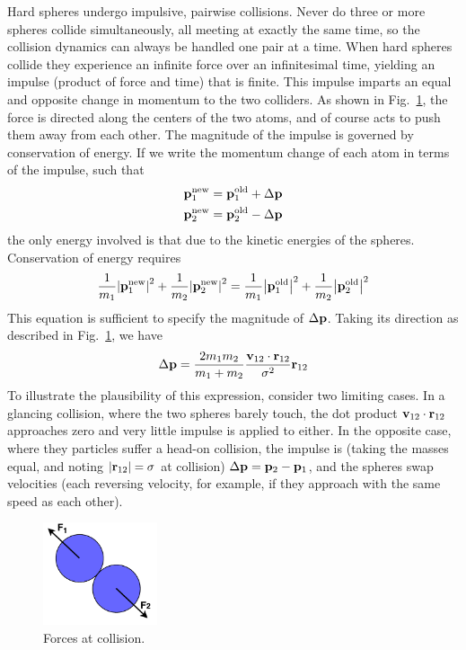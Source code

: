 \documentclass[9pt,bestpractices]{molsim}
\begin{document}
Hard spheres undergo impulsive, pairwise collisions. Never do three or
more spheres collide simultaneously, all meeting at exactly the same
time, so the collision dynamics can always be handled one pair at a
time. When hard spheres collide they experience an infinite force over
an infinitesimal time, yielding an impulse (product of force and time)
that is finite. This impulse imparts an equal and opposite change in
momentum to the two colliders. As shown in Fig.~\ref{fig:force}, the force is
directed along the centers of the two atoms, and of course acts to push
them away from each other. The magnitude of the impulse is governed by
conservation of energy. If we write the momentum change of each atom in
terms of the impulse, such that
\begin{align*}
  &{\bf{p}}_1^{\rm new} = {\bf{p}}_1^{\rm old} + \Delta {\bf{p}}\\
  &{\bf{p}}_2^{\rm new} = {\bf{p}}_2^{\rm old} - \Delta {\bf{p}}
\end{align*}
the only energy involved is that due to the kinetic energies of the
spheres. Conservation of energy requires
\[\frac{1}{{{m_1}}}{\left| {{\bf{p}}_1^{\rm new}} \right|^2} + \frac{1}{{{m_2}}}{\left| {{\bf{p}}_2^{\rm new}} \right|^2} = \frac{1}{{{m_1}}}{\left| {{\bf{p}}_1^{\rm old}} \right|^2} + \frac{1}{{{m_2}}}{\left| {{\bf{p}}_2^{\rm old}} \right|^2}\]
This equation is sufficient to specify the magnitude of $\Delta {\bf{p}}$. Taking its
direction as described in Fig.~\ref{fig:force}, we have
\[\Delta {\bf{p}} = \frac{{2{m_1}{m_2}}}{{{m_1} + {m_2}}}\frac{{{{\bf{v}}_{12}} \cdot {{\bf{r}}_{12}}}}{{{\sigma ^2}}}{{\bf{r}}_{12}}\]
To illustrate the plausibility of this expression, consider two limiting
cases. In a glancing collision, where the two spheres barely touch, the
dot product ${\bf v}_{12}\cdot{\bf r}_{12}$ approaches zero and very little impulse is applied to
either. In the opposite case, where they particles suffer a head-on
collision, the impulse is (taking the masses equal, and noting $|{\bf r}_{12}|=\sigma$ at
collision) $\Delta {\bf{p}} = {{\bf{p}}_2} - {{\bf{p}}_1}$, and the spheres swap velocities (each reversing velocity,
for example, if they approach with the same speed as each other).

\begin{figure}
  \centering
  \includegraphics[width=0.3\textwidth]{HSMD_figures/HSMD_collision.pdf}
  \caption{\label{fig:force}Forces at collision.}
\end{figure}
  
\end{document}
